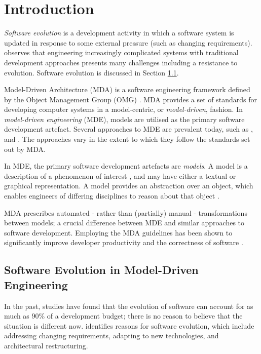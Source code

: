 \section{Introduction}
\textit{Software evolution} is a development activity in which a software system is updated in response to some external pressure (such as changing requirements). \cite{brooks86nosilverbullet} observes that engineering increasingly complicated systems with traditional development approaches presents many challenges including a resistance to evolution. Software evolution is discussed in Section \ref{sub:software_evo}.

Model-Driven Architecture (MDA) is a software engineering framework defined by the Object Management
Group (OMG) \cite{omg}. MDA provides a set of standards for developing computer systems in a model-centric, or \textit{model-driven}, fashion. In \textit{model-driven engineering} (MDE), models are utilised as the primary software development artefact. Several approaches to MDE are prevalent today, such as \cite{stahl06mdsd}, \cite{kelly08dsm} and \cite{greenfield04software}. The approaches vary in the extent to which they follow the standards set out by MDA.

In MDE, the primary software development artefacts are \textit{models}. A model is a description of a phenomenon of interest \cite{jackson96software}, and may have either a textual or graphical representation. A model provides an abstraction over an object, which enables engineers of differing disciplines to reason about that object \cite{kolovos06eol}.

MDA prescribes automated - rather than (partially) manual - transformations between models; a crucial difference between MDE and similar approaches to software development. Employing the MDA guidelines has been shown to significantly improve developer productivity and the correctness of software \cite{watson08mdahistory}.

\subsection{Software Evolution in Model-Driven Engineering}
\label{sub:software_evo}
In the past, studies \cite{erlikh00leveraging,moad90maintaining} have found that the evolution of software can account for as much as 90\% of a development budget; there is no reason to believe that the situation is different now. \cite{sjoberg93quantifying} identifies reasons for software evolution, which include addressing changing requirements, adapting to new technologies, and architectural restructuring.

